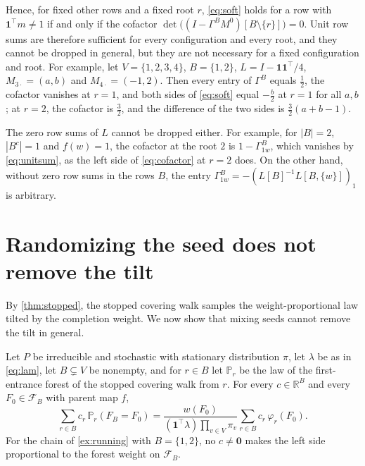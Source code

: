 \documentclass[onefignum,onetabnum]{siamart250211}
\numberwithin{theorem}{section}
\numberwithin{equation}{section}
\newcommand{\Fset}{\mathcal{F}}
\newcommand{\R}{\mathbb{R}}
\newcommand{\pr}{\mathbb{P}}
\newcommand{\one}{\mathbf{1}}
\newcommand{\zero}{\mathbf{0}}
\begin{document}
Hence, for fixed other rows and a fixed root $r$, \eqref{eq:soft} holds
for a row with $\one^{\top}m\ne1$ if and only if the cofactor
$\det\big((I-\Gamma^BM^{0})[B\setminus\{r\}]\big)=0$. Unit row
sums are therefore sufficient for every configuration and every root,
and they cannot be dropped in general, but they are not necessary
for a fixed configuration and root. For example, let $V=\{1,2,3,4\}$,
$B=\{1,2\}$, $L=I-\one\one^{\top}/4$, $M_{3\cdot}=(a,b)$ and
$M_{4\cdot}=(-1,2)$. Then every entry of $\Gamma^B$ equals $\tfrac12$,
the cofactor vanishes at $r=1$, and both sides of \eqref{eq:soft} equal
$-\tfrac b2$ at $r=1$ for all $a,b$; at $r=2$, the cofactor is $\tfrac32$,
and the difference of the two sides is $\tfrac32(a+b-1)$.

The zero row sums of $L$ cannot be dropped either. For example,
for $|B|=2$, $|B^c|=1$ and $f(w)=1$, the cofactor at the root $2$ is
$1-\Gamma^B_{1w}$, which vanishes by \eqref{eq:unitsum}, as the left side
of \eqref{eq:cofactor} at $r=2$ does. On the other hand, without zero
row sums in the rows $B$, the entry
$\Gamma^B_{1w}=-(L[B]^{-1}L[B,\{w\}])_1$ is arbitrary.

\section{Randomizing the seed does not remove the tilt}\label{sec:sm-seed}

By \cref{thm:stopped}, the stopped covering walk samples the
weight-proportional law tilted by the completion weight. We now show that
mixing seeds cannot remove the tilt in general.

\begin{proposition}\label{prop:notilt}
Let $P$ be irreducible and stochastic with stationary distribution
$\pi$, let $\lambda$ be as in \eqref{eq:lam}, let $B\subsetneq V$ be
nonempty, and for $r\in B$ let $\pr_r$ be the
law of the first-entrance forest of the stopped covering walk from $r$.
For every $c\in\R^{B}$ and every $F_0\in\Fset_B$ with parent map $f$,
\begin{equation}\label{eq:mixture}
\sum_{r\in B}c_r\,\pr_r(F_B=F_0)
=\frac{w(F_0)}{(\one^{\top}\lambda)\prod_{v\in V}\pi_v}
\sum_{r\in B}c_r\,\varphi_r(F_0).
\end{equation}
For the chain of \cref{ex:running} with $B=\{1,2\}$, no $c\ne\zero$
makes the left side proportional to the forest weight on $\Fset_B$.
\end{proposition}
\end{document}
